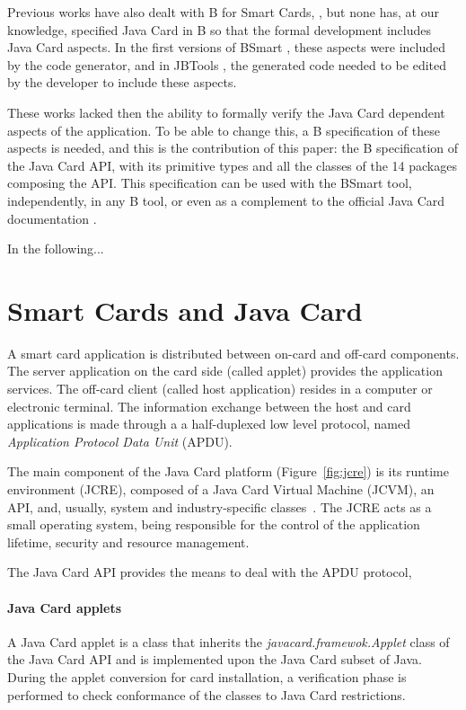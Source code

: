 \documentclass{entcs}
\begin{document}
Previous works have also dealt with B for Smart Cards,
\cite{Bert:2003,JBtools,tatibouet:lncs,requetBtoC}, but none has, at
our knowledge, specified Java Card in B so that the formal development
includes Java Card aspects. In the first versions of BSmart
\cite{Gomes10}, these aspects were included by the code generator, and
in JBTools \cite{JBtools}, the generated code needed to be edited by
the developer to include these aspects.

These works lacked then the ability to formally verify the Java Card
dependent aspects of the application. To be able to change this, a B
specification of these aspects is needed, and this is the contribution
of this paper: the B specification of the Java Card API, with its
primitive types and all the classes of the 14 packages composing the
API. This specification can be used with the BSmart tool, 
independently, in any B tool, or even as a complement to the official
Java Card documentation \cite{oracle}.

In the following...

\section{Smart Cards and Java Card}\label{sec:javacard}

A smart card application is distributed between on-card and off-card
components.  The server application on the card side (called applet)
provides the application services. The off-card client (called host
application) resides in a computer or electronic terminal. The information 
exchange between the host and card applications is
made through a a half-duplexed low level protocol, named
\emph{Application Protocol Data Unit} (APDU).  

The main component of the Java Card platform (Figure~\ref{fig:jcre})
is its runtime environment (JCRE), composed of a Java Card Virtual
Machine (JCVM), an API, and, usually, system and
industry-specific classes~\cite{chen:2000}. The JCRE acts as a small
operating system, being responsible for the control of the application
lifetime, security and resource management.

The Java Card API provides the means to deal with the APDU protocol, 

\paragraph{Java Card applets}\label{sec:applets}

A Java Card applet is a class that inherits the
\emph{javacard.framewok.Applet} class of the Java Card API and is
implemented upon the Java Card subset of Java.  During the applet
conversion for card installation, a verification phase is performed to
check conformance of the classes to Java Card restrictions.
\end{document}
